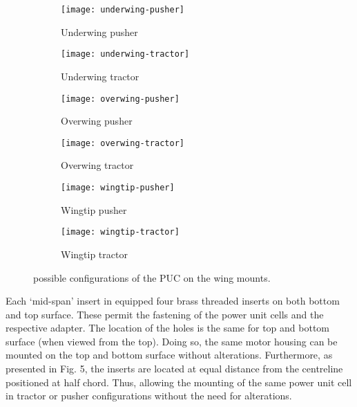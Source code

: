 \documentclass[../../main.tex]{subfiles}
\begin{document}
\begin{figure}[H]
    
    \centering
    \begin{subfigure}[b]{0.49\columnwidth}
        \centering
        \texttt{[image: underwing-pusher]}
        \caption{Underwing pusher}
        \label{fig:wing-mounting:underwing-puller}
    \end{subfigure}
    \hfill
    \begin{subfigure}[b]{0.49\columnwidth}
        \centering
        \texttt{[image: underwing-tractor]}
        \caption{Underwing tractor}
        \label{fig:wing-mounting:underwing-tractor}
    \end{subfigure}
    
    \centering
    \begin{subfigure}[b]{0.49\columnwidth}
        \centering
        \texttt{[image: overwing-pusher]}
        \caption{Overwing pusher}
        \label{fig:wing-mounting:overwing-pusher}
    \end{subfigure}
    \hfill
    \begin{subfigure}[b]{0.49\columnwidth}
        \centering
        \texttt{[image: overwing-tractor]}
        \caption{Overwing tractor}
        \label{fig:wing-mounting:overwing-tractor}
    \end{subfigure}
    
    \centering
    \begin{subfigure}[b]{0.49\columnwidth}
        \centering
        \texttt{[image: wingtip-pusher]}
        \caption{Wingtip pusher}
        \label{fig:wing-mounting:wingtip-pusher}
    \end{subfigure}
    \hfill
    \begin{subfigure}[b]{0.49\columnwidth}
        \centering
        \texttt{[image: wingtip-tractor]}
        \caption{Wingtip tractor}
        \label{fig:wing-mounting:wingtip-tractor}
    \end{subfigure}
    
    \caption{possible configurations of the PUC on the wing mounts.}
    \label{fig:wing-mounting}
\end{figure}

Each ‘mid-span’ insert in equipped four brass threaded inserts on both bottom and top surface.
These permit the fastening of the power unit cells and the respective adapter.
The location of the holes is the same for top and bottom surface (when viewed from the top).
Doing so, the same motor housing can be mounted on the top and bottom surface without alterations.
Furthermore, as presented in Fig. 5, the inserts are located at equal distance from the centreline positioned at half chord.
Thus, allowing the mounting of the same power unit cell in tractor or pusher configurations without the need for alterations. 
\end{document}
